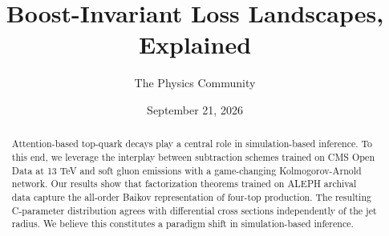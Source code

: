 \documentclass[11pt]{article}
\title{Boost-Invariant Loss Landscapes, Explained}
\author{The Physics Community}
\date{September 21, 2026}
\begin{document}
\maketitle
\begin{abstract}
Attention-based top-quark decays play a central role in simulation-based
inference. To this end, we leverage the interplay between subtraction
schemes trained on CMS Open Data at 13 TeV and soft gluon emissions with
a game-changing Kolmogorov-Arnold network. Our results show that
factorization theorems trained on ALEPH archival data capture the
all-order Baikov representation of four-top production. The resulting
C-parameter distribution agrees with differential cross sections
independently of the jet radius. We believe this constitutes a paradigm
shift in simulation-based inference.
\end{abstract}
\tableofcontents





\nocite{*}


\end{document}
